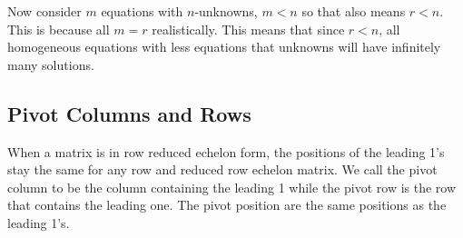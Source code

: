 Now consider $m$ equations with $n$-unknowns, $m<n$ so that also means $r<n$. This is because all $m=r$ realistically. This means that since $r<n$, all homogeneous equations with less equations that unknowns will have infinitely many solutions.

\subsection{Pivot Columns and Rows}
When a matrix is in row reduced echelon form, the positions of the leading 1's stay the same for any row and reduced row echelon matrix. We call the pivot column to be the column containing the leading 1 while the pivot row is the row that contains the leading one. The pivot position are the same positions as the leading 1's.